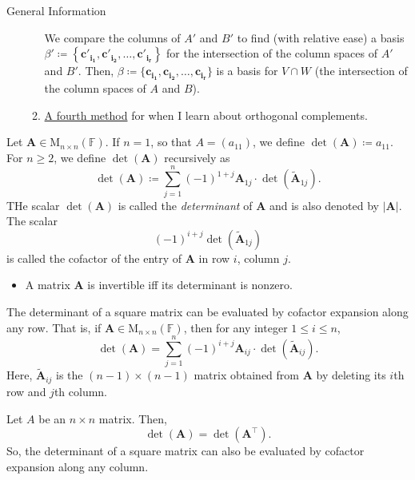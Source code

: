 \documentclass[../Notes.tex]{subfiles}
\begin{document}
\begin{stbox}{General Information}
\begin{itemize}
\begin{enumerate}
        We compare the columns of \(A'\) and \(B'\) to find (with relative ease) a basis \(\beta'\coloneq\left\{\mathbf{c'_{i_1}},\mathbf{c'_{i_2}},\dots,\mathbf{c'_{i_r}}\right\}\) for the intersection of the column spaces of \(A'\) and \(B'\). Then, \(\beta\coloneq\{\mathbf{c_{i_1}},\mathbf{c_{i_2}},\dots,\mathbf{c_{i_r}}\}\) is a basis for \(V\cap W\) (the intersection of the column spaces of \(A\) and \(B\)).
        \item \href{https://math.stackexchange.com/a/4837004}{A fourth method} for when I learn about orthogonal complements. 
        \end{enumerate}
    \end{itemize}
\end{stbox}
\begin{definition}{}{}
    Let \(\mathbf{A}\in \mathrm{M}_{n\times n}(\mathbb{F})\). If \(n=1\), so that \(A=(a_11)\), we define \(\det(\mathbf{A})\coloneq a_11\). For \(n\geq 2\), we define \(\det(\mathbf{A})\) recursively as 
    \[\det(\mathbf{A})\coloneq \sum_{j=1}^{n}{(-1)^{1+j}}\mathbf{A}_{1j}\cdot \det(\widetilde{\mathbf{A}}_{1j}).\]
    THe scalar \(\det(\mathbf{A})\) is called the \emph{determinant} of \(\mathbf{A}\) and is also denoted by \(\lvert \mathbf{A} \rvert\). The scalar 
    \[(-1)^{i+j}\det(\widetilde{\mathbf{A}}_{1j})\]
    is called the cofactor of the entry of \(\mathbf{A}\) in row \(i\), column \(j\).
\end{definition}
\begin{stbox}{}
    \begin{itemize}
        \item A matrix \(\mathbf{A}\) is invertible iff its determinant is nonzero. 
    \end{itemize}
\end{stbox}
\begin{theorem}{}{}
    The determinant of a square matrix can be evaluated by cofactor expansion along any row. That is, if \(\mathbf{A} \in \mathrm{M}_{n\times n}(\mathbb{F})\), then for any integer \(1\leq i\leq n\),
        \[\det(\mathbf{A})=\sum_{j=1}^{n}{(-1)}^{i+j}\mathbf{A}_{ij}\cdot \det(\widetilde{\mathbf{A}}_{ij}).\] 
        Here, \(\widetilde{\mathbf{A}}_{ij}\) is the \((n-1)\times(n-1)\) matrix obtained from \(\mathbf{A}\) by deleting its \(i\)th row and \(j\)th column.
\end{theorem}
\begin{theorem}{}{}
    Let \(A\) be an \(n\times n\) matrix. Then,
    \[\det(\mathbf{A})=\det(\mathbf{A}^\top).\]
    So, the determinant of a square matrix can also be evaluated by cofactor expansion along any column.
\end{theorem}
\end{document}
